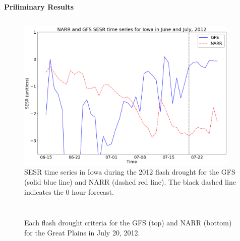 \documentclass{beamer}
\begin{document}
\begin{frame}[t]{}
\begin{columns}[t]
\begin{creambox}
\begin{block}{\bfseries Priliminary Results}
\begin{columns}[t]
						\begin{figure}[htp]
							\captionsetup{width = 0.95\textwidth}
							\includegraphics[width = 0.95\textwidth, frame]{../Figures/Poster/SESR_timeseries_for_NARR_GFS.png}
							\caption{\normalsize SESR time series in Iowa during the 2012 flash drought for the GFS (solid blue line) and NARR (dashed red line). The black dashed line indicates the 0 hour forecast.}
						\end{figure}
					\end{columns}
					
					\vspace*{-0.25cm} %
					\begin{columns}[t]
						\begin{figure}[htp]
							\captionsetup{width = 0.95\textwidth}
							{\setlength{\fboxsep}{0pt}%
								} %
							\caption{\normalsize Each flash drought criteria for the GFS (top) and NARR (bottom) for the Great Plains in July 20, 2012.}
						\end{figure}
					

\end{columns}
\end{block}
\end{creambox}
\end{columns}
\end{frame}
\end{document}
